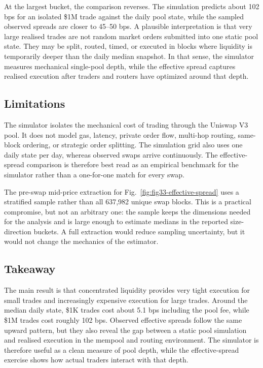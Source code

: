 At the largest bucket, the comparison reverses.  The simulation predicts about
102 bps for an isolated \$1M trade against the daily pool state, while the
sampled observed spreads are closer to 45--50 bps.  A plausible interpretation
is that very large realised trades are not random market orders submitted into
one static pool state.  They may be split, routed, timed, or executed in blocks
where liquidity is temporarily deeper than the daily median snapshot.  In that
sense, the simulator measures mechanical single-pool depth, while the effective
spread captures realised execution after traders and routers have optimized
around that depth.

\subsection{Limitations}
\label{subsec:m3-limitations}

The simulator isolates the mechanical cost of trading through the Uniswap V3
pool.  It does not model gas, latency, private order flow, multi-hop routing,
same-block ordering, or strategic order splitting.  The simulation grid also
uses one daily state per day, whereas observed swaps arrive continuously.  The
effective-spread comparison is therefore best read as an empirical benchmark
for the simulator rather than a one-for-one match for every swap.

The pre-swap mid-price extraction for Fig.~\ref{fig:fig33-effective-spread}
uses a stratified sample rather than all 637,982 unique swap blocks.  This is a
practical compromise, but not an arbitrary one: the sample keeps the dimensions
needed for the analysis and is large enough to estimate medians in the reported
size-direction buckets.  A full extraction would reduce sampling uncertainty,
but it would not change the mechanics of the estimator.

\subsection{Takeaway}
\label{subsec:m3-takeaway}

The main result is that concentrated liquidity provides very tight execution
for small trades and increasingly expensive execution for large trades.  Around
the median daily state, \$1K trades cost about 5.1 bps including the pool fee,
while \$1M trades cost roughly 102 bps.  Observed effective spreads follow the
same upward pattern, but they also reveal the gap between a static pool
simulation and realised execution in the mempool and routing environment.  The
simulator is therefore useful as a clean measure of pool depth, while the
effective-spread exercise shows how actual traders interact with that depth.
